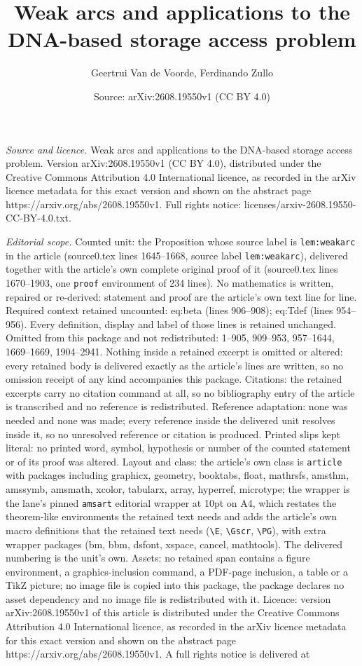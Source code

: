 \documentclass[10pt,a4paper]{amsart}
\title[Weak arcs and applications to the DNA-based storage access p]{Weak arcs and applications to the DNA-based storage access problem}
\author{Geertrui Van de Voorde, Ferdinando Zullo}
\date{Source: arXiv:2608.19550v1 (CC BY 4.0)}
\begin{document}
\maketitle

\noindent\emph{Source and licence.} Weak arcs and applications to the DNA-based storage access problem. Version arXiv:2608.19550v1 (CC BY 4.0), distributed under the Creative Commons Attribution 4.0 International licence, as recorded in the arXiv licence metadata for this exact version and shown on the abstract page https://arxiv.org/abs/2608.19550v1. Full rights notice: licenses/arxiv-2608.19550-CC-BY-4.0.txt.\par\smallskip

\noindent\textit{Editorial scope.} Counted unit: the Proposition whose source label is \texttt{lem:weakarc} in the article (source0.tex lines 1645--1668, source label \texttt{lem:weakarc}), delivered together with the article's own complete original proof of it (source0.tex lines 1670--1903, one \texttt{proof} environment of 234 lines). No mathematics is written, repaired or re-derived: statement and proof are the article's own text line for line. Required context retained uncounted: eq:beta (lines 906--908); eq:Tdef (lines 954--956). Every definition, display and label of those lines is retained unchanged. Omitted from this package and not redistributed: 1--905, 909--953, 957--1644, 1669--1669, 1904--2941. Nothing inside a retained excerpt is omitted or altered: every retained body is delivered exactly as the article's lines are written, so no omission receipt of any kind accompanies this package. Citations: the retained excerpts carry no citation command at all, so no bibliography entry of the article is transcribed and no reference is redistributed. Reference adaptation: none was needed and none was made; every reference inside the delivered unit resolves inside it, so no unresolved reference or citation is produced. Printed slips kept literal: no printed word, symbol, hypothesis or number of the counted statement or of its proof was altered. Layout and class: the article's own class is \texttt{article} with packages including graphicx, geometry, booktabs, float, mathrsfs, amsthm, amssymb, amsmath, xcolor, tabularx, array, hyperref, microtype; the wrapper is the lane's pinned \texttt{amsart} editorial wrapper at 10pt on A4, which restates the theorem-like environments the retained text needs and adds the article's own macro definitions that the retained text needs (\texttt{\textbackslash E}, \texttt{\textbackslash Gscr}, \texttt{\textbackslash PG}), with extra wrapper packages (bm, bbm, dsfont, xspace, cancel, mathtools). The delivered numbering is the unit's own. Assets: no retained span contains a figure environment, a graphics-inclusion command, a PDF-page inclusion, a table or a TikZ picture; no image file is copied into this package, the package declares no asset dependency and no image file is redistributed with it. Licence: version arXiv:2608.19550v1 of this article is distributed under the Creative Commons Attribution 4.0 International licence, as recorded in the arXiv licence metadata for this exact version and shown on the abstract page https://arxiv.org/abs/2608.19550v1. A full rights notice is delivered at 
\end{document}
